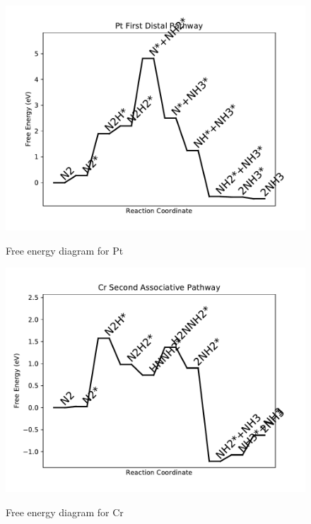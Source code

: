 \documentclass{article}
\begin{document}
\newpage
\begin{figure}
\includegraphics[width=1\linewidth]{data/plots/Pt_distal_1.pdf}
\label{fig:Pt_distal_1}
\caption{Free energy diagram for Pt}
\end{figure}

\begin{figure}
\includegraphics[width=1\linewidth]{data/plots/Cr_associative_2.pdf}
\label{fig:Cr_associative_2}
\caption{Free energy diagram for Cr}
\end{figure}
\end{document}

